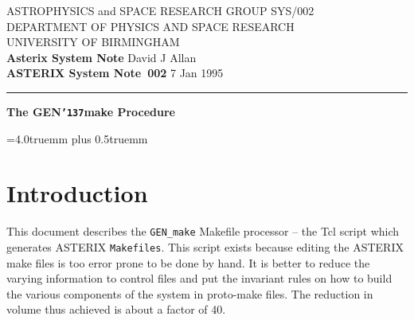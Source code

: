 \pagestyle{myheadings}
\newcommand{\astdoccategory}  {ASTERIX System Note}
\newcommand{\astdocinitials}  {SYS}
\newcommand{\astdocnumber}    {002}
\newcommand{\astdocauthors}   {David J Allan}
\newcommand{\astdocdate}      {7 Jan 1995}
\newcommand{\astdoctitle}     {The GEN\_make Procedure}
\newcommand{\astdocname}      {\astdocinitials /\astdocnumber}
\renewcommand{\_}             {{\tt\char'137}}


\setlength{\textwidth}{160mm}           %
\setlength{\textheight}{240mm}          %
\setlength{\oddsidemargin}{0pt}         %
\setlength{\evensidemargin}{0pt}        %
\setlength{\topmargin}{-5mm}            %
\setlength{\headsep}{8mm}               %
\setlength{\parindent}{0mm}

\thispagestyle{empty}
ASTROPHYSICS and SPACE RESEARCH GROUP \hfill \astdocname \\
DEPARTMENT OF PHYSICS AND SPACE RESEARCH\\
UNIVERSITY OF BIRMINGHAM\\
{\large\bf Asterix System Note} \hfill \astdocauthors\\
{\large\bf \astdoccategory\ \astdocnumber} \hfill \astdocdate\\
\vspace{-4mm}
\rule{\textwidth}{0.5mm}
\vspace{5mm}
\begin{center}
{\huge\bf \astdoctitle}
\end{center}
\vspace{5mm}

\parskip=4.0truemm plus 0.5truemm       %

\markright{\astdocname}

\section{Introduction}

This document describes the \verb+GEN_make+ Makefile processor -- the Tcl
script which generates ASTERIX \verb+Makefiles+. This script exists because
editing the ASTERIX make files is too error prone to be done by hand. It is
better to reduce the varying information to control files and put the
invariant rules on how to build the various components of the system in 
proto-make files. The reduction in volume thus achieved is about a factor
of 40.
 
